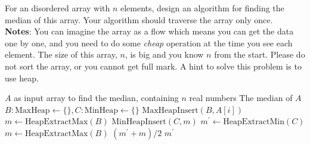 \noindent {} For an disordered array with $n$ elements, design an algorithm for finding the median of this array. Your algorithm should traverse the array only once. \\
\textbf{Notes}: You can imagine the array as a flow which means you can get the data one by one, and you need to do some \textit{cheap} operation at the time you see each element. The size of this array, $n$, is big and you know $n$ from the start. Please do not sort the array, or you cannot get full mark. A hint to solve this problem is to use heap. \\


\begin{algorithm}[!ht]
\caption{\textbf{Find Median Using Heap}$(A)$ 
} 
\label{alg:heap-median}
\begin{algorithmic}[1]
\Require $A$ as input array to find the median, containing $n$ real numbers
\Ensure The median of $A$
\State $B: \mathrm{MaxHeap} \leftarrow \{\}, C: \mathrm{MinHeap} \leftarrow \{\}$
    \State $\mathrm{MaxHeapInsert}(B, A[i])$
        \State $m \leftarrow \mathrm{HeapExtractMax}(B)$ 
        \State $\mathrm{MinHeapInsert}(C, m)$
    \EndIf
\EndFor
\State $m^{'} \leftarrow \mathrm{HeapExtractMin}(C)$
    \State $m \leftarrow \mathrm{HeapExtractMax}(B)$
    \State \Return $(m^{'} + m)/2$
\Else
    \State \Return $m^{'}$
\EndIf
\end{algorithmic}
\end{algorithm}